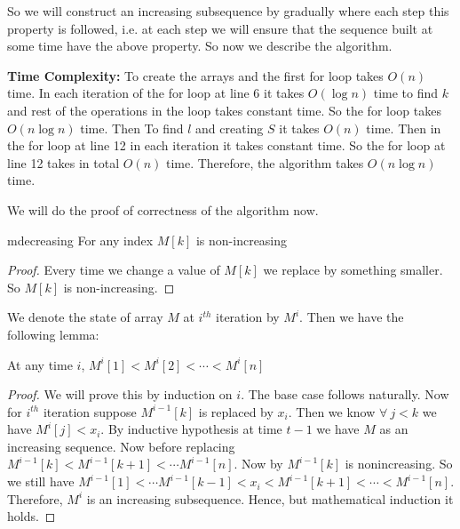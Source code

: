 So we will construct an increasing subsequence by gradually where each step this property is followed, i.e. at each step we will ensure that the sequence built at some time have the above property. So now we describe the algorithm. 
\begin{algorithm}
	\DontPrintSemicolon
\caption{$(A)$}
\end{algorithm}\parinf

\textbf{Time Complexity:} To create the arrays and the first for loop takes $O(n)$ time. In each iteration of the for loop at line 6 it takes $O(\log n)$ time to find $k$ and rest of the operations in the loop takes constant time. So the for loop takes $O(n\log n)$ time.  Then To find $l$ and creating $S$ it takes $O(n)$ time. Then in the for loop at line 12 in each iteration it takes constant time. So the for loop at line 12 takes in total $O(n)$ time. Therefore, the algorithm takes $O(n\log n)$ time. \parinn

We will do the proof of correctness of the algorithm now.
\begin{lemma}{}{mdecreasing}
	For any index $M[k]$ is non-increasing
\end{lemma}
\begin{proof}
	Every time we change a value of $M[k]$ we replace by something smaller. So $M[k]$ is non-increasing.
\end{proof}
We denote the state of array $M$ at $i^{th}$ iteration by $M^i$. Then we have the following lemma:

\begin{lemma}{}{}
At any time $i$, $M^i[1]< M^i[2]< \cdots< M^i[n]$
\end{lemma}
\begin{proof}
We will prove this by induction on $i$. The base case follows naturally. Now for $i^{th}$ iteration suppose $M^{i-1}[k]$ is replaced by $x_i$. Then we know $\forall \ j<k$ we have $M^i[j]< x_i$. By inductive hypothesis at time $t-1$ we have $M$ as an increasing sequence. Now before replacing $M^{i-1}[k]< M^{i-1}[k+1]< \cdots M^{i-1}[n]$. Now by  $M^{i-1}[k]$ is nonincreasing. So we still have $M^{i-1}[1]< \cdots M^{i-1}[k-1]< x_i < M^{i-1}[k+1]< \cdots < M^{i-1}[n]$. Therefore, $M^{i}$ is an increasing subsequence. Hence, but mathematical induction it holds.
\end{proof}

